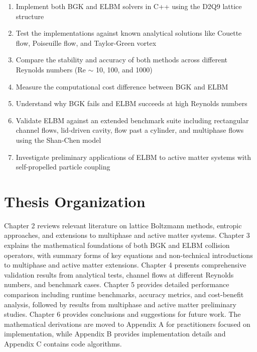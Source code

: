 \begin{enumerate}
    \item Implement both BGK and ELBM solvers in C++ using the D2Q9 lattice structure
    \item Test the implementations against known analytical solutions like Couette flow, Poiseuille flow, and Taylor-Green vortex
    \item Compare the stability and accuracy of both methods across different Reynolds numbers (Re $\sim$ 10, 100, and 1000)
    \item Measure the computational cost difference between BGK and ELBM
    \item Understand why BGK fails and ELBM succeeds at high Reynolds numbers
    \item Validate ELBM against an extended benchmark suite including rectangular channel flows, lid-driven cavity, flow past a cylinder, and multiphase flows using the Shan-Chen model
    \item Investigate preliminary applications of ELBM to active matter systems with self-propelled particle coupling
\end{enumerate}

\section{Thesis Organization}

Chapter 2 reviews relevant literature on lattice Boltzmann methods, entropic approaches, and extensions to multiphase and active matter systems. Chapter 3 explains the mathematical foundations of both BGK and ELBM collision operators, with summary forms of key equations and non-technical introductions to multiphase and active matter extensions. Chapter 4 presents comprehensive validation results from analytical tests, channel flows at different Reynolds numbers, and benchmark cases. Chapter 5 provides detailed performance comparison including runtime benchmarks, accuracy metrics, and cost-benefit analysis, followed by results from multiphase and active matter preliminary studies. Chapter 6 provides conclusions and suggestions for future work. The mathematical derivations are moved to Appendix A for practitioners focused on implementation, while Appendix B provides implementation details and Appendix C contains code algorithms.
